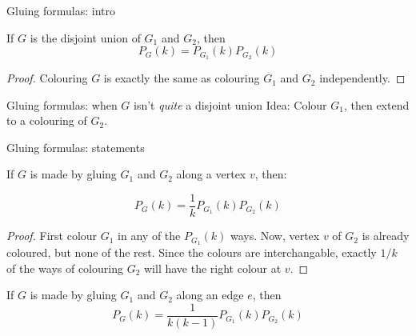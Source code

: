 \documentclass{beamer}
\begin{document}
\begin{frame}{Gluing formulas: intro}
  \begin{lemma} If $G$ is the disjoint union of $G_1$ and $G_2$, then
    $$P_G(k)=P_{G_1}(k)P_{G_2}(k)$$
    \end{lemma}
\begin{proof} Colouring $G$ is exactly the same as colouring $G_1$ and $G_2$ independently.
\end{proof}


\begin{block}{Gluing formulas: when $G$ isn't \emph{quite} a disjoint union}
  Idea: Colour $G_1$, then extend to a colouring of $G_2$.
\end{block}
\end{frame}
\begin{frame}{Gluing formulas: statements}
    \begin{lemma}If $G$ is made by gluing $G_1$ and $G_2$ along a vertex $v$, then:

      $$P_G(k)=\frac{1}{k}P_{G_1}(k)P_{G_2}(k)$$
      \end{lemma}



    
    \begin{proof}First colour $G_1$ in any of the $P_{G_1}(k)$ ways.  Now, vertex $v$ of $G_2$ is already coloured, but none of the rest.  Since the colours are interchangable, exactly $1/k$ of the ways of colouring $G_2$ will have the right colour at $v$.
\end{proof}
    \begin{lemma}
      If $G$ is made by gluing $G_1$ and $G_2$ along an edge $e$, then $$P_G(k)=\frac{1}{k(k-1)} P_{G_1}(k)P_{G_2}(k)$$
\end{lemma}


  
\end{frame}
\end{document}
